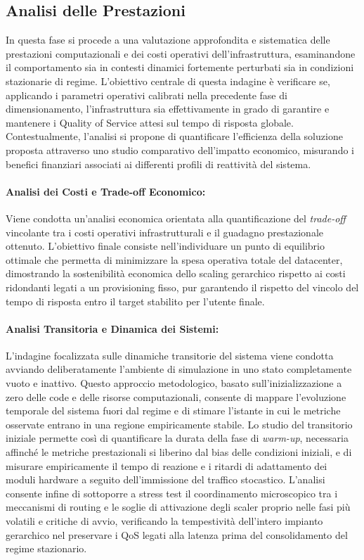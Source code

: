 ﻿\documentclass[a4paper,12pt]{article}
\begin{document}
\subsection{Analisi delle Prestazioni}
In questa fase si procede a una valutazione approfondita e sistematica delle prestazioni computazionali e dei costi operativi dell'infrastruttura, esaminandone il comportamento sia in contesti dinamici fortemente perturbati sia in condizioni stazionarie di regime. L'obiettivo centrale di questa indagine è verificare se, applicando i parametri operativi calibrati nella precedente fase di dimensionamento, l'infrastruttura sia effettivamente in grado di garantire e mantenere i Quality of Service attesi sul tempo di risposta globale. Contestualmente, l'analisi si propone di quantificare l'efficienza della soluzione proposta attraverso uno studio comparativo dell'impatto economico, misurando i benefici finanziari associati ai differenti profili di reattività del sistema.

\paragraph{Analisi dei Costi e Trade-off Economico:}
Viene condotta un'analisi economica orientata alla quantificazione del \textit{trade-off} vincolante tra i costi operativi infrastrutturali e il guadagno prestazionale ottenuto. L'obiettivo finale consiste nell'individuare un punto di equilibrio ottimale che permetta di minimizzare la spesa operativa totale del datacenter, dimostrando la sostenibilità economica dello scaling gerarchico rispetto ai costi ridondanti legati a un provisioning fisso, pur garantendo il rispetto del vincolo del tempo di risposta entro il target stabilito per l'utente finale.

\paragraph{Analisi Transitoria e Dinamica dei Sistemi:}
L'indagine focalizzata sulle dinamiche transitorie del sistema viene condotta avviando deliberatamente l'ambiente di simulazione in uno stato completamente vuoto e inattivo. Questo approccio metodologico, basato sull'inizializzazione a zero delle code e delle risorse computazionali, consente di mappare l'evoluzione temporale del sistema fuori dal regime e di stimare l'istante in cui le metriche osservate entrano in una regione empiricamente stabile. Lo studio del transitorio iniziale permette così di quantificare la durata della fase di \textit{warm-up}, necessaria affinché le metriche prestazionali si liberino dal bias delle condizioni iniziali, e di misurare empiricamente il tempo di reazione e i ritardi di adattamento dei moduli hardware a seguito dell'immissione del traffico stocastico. L'analisi consente infine di sottoporre a stress test il coordinamento microscopico tra i meccanismi di routing e le soglie di attivazione degli scaler proprio nelle fasi più volatili e critiche di avvio, verificando la tempestività dell'intero impianto gerarchico nel preservare i QoS legati alla latenza prima del consolidamento del regime stazionario.
\end{document}
